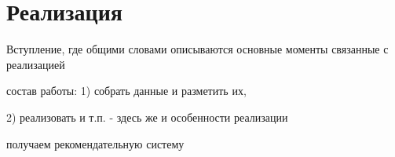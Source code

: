 \section{Реализация}
    Вступление, где общими словами описываются основные моменты связанные с реализацией

     состав работы: 1) собрать данные и  разметить их,

     2) реализовать и т.п. - здесь же и особенности реализации

    получаем рекомендательную систему

    
    
    
    
    
    
